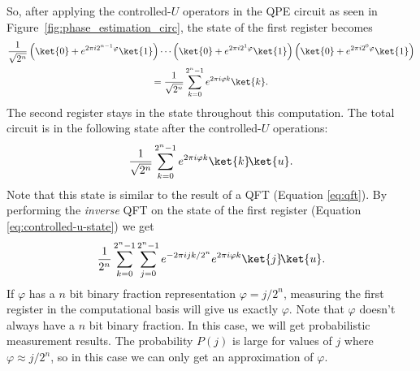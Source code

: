 So, after applying the controlled-$U$ operators in the QPE circuit as seen in Figure~\ref{fig:phase_estimation_circ}, the state of the first register becomes
\begin{gather}
  \dfrac{1}{\sqrt{2^n}}\left(\ket{0} + e^{2\pi i 2^{n-1} \varphi}\ket{1}\right)
  \dotsb
  \left(\ket{0} + e^{2\pi i 2^1 \varphi}\ket{1}\right)
  \left(\ket{0} + e^{2\pi i 2^0 \varphi}\ket{1}\right) \\
  = \dfrac{1}{\sqrt{2^n}}\sum_{k=0}^{2^n-1} e^{2\pi i\varphi k}\ket{k}.
\end{gather}
The second register stays in the state  throughout this computation. The total circuit is in the following state after the controlled-$U$ operations:
\begin{equation} \label{eq:controlled-u-state}
  \dfrac{1}{\sqrt{2^n}}\sum_{k=0}^{2^n-1} e^{2\pi i\varphi k}\ket{k}\!\ket{u}.
\end{equation}
Note that this state is similar to the result of a QFT (Equation \ref{eq:qft}). By performing the \emph{inverse} QFT on the state of the first register (Equation \ref{eq:controlled-u-state}) we get
\begin{equation}
  \dfrac{1}{2^n}\sum_{k=0}^{2^n-1}\sum_{j=0}^{2^n-1} e^{-2\pi ijk/2^n} e^{2\pi i\varphi k}\ket{j}\!\ket{u}.
\end{equation}
If $\varphi$ has a $n$ bit binary fraction representation $\varphi = j/2^n$, measuring the first register in the computational basis will give us exactly $\varphi$. Note that $\varphi$ doesn't always have a $n$ bit binary fraction. In this case, we will get probabilistic measurement results. The probability $P(j)$ is large for values of $j$ where $\varphi \approx j/2^n$, so in this case we can only get an approximation of $\varphi$.


